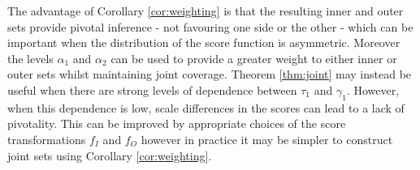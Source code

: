 \begin{remark}
	The advantage of Corollary \ref{cor:weighting} is that the resulting inner and outer sets provide pivotal inference - not favouring one side or the other - which can be important when the distribution of the score function is asymmetric. Moreover the levels $\alpha_1$ and $\alpha_2$ can be used to provide a greater weight to either inner or outer sets whilst maintaining joint coverage. Theorem \ref{thm:joint} may instead be useful when there are strong levels of dependence between $\tau_1$ and $\gamma_1$. However, when this dependence is low, scale differences in the scores can lead to a lack of pivotality. This can be improved by appropriate choices of the score transformations $f_I$ and $f_O$ however in practice it may be simpler to construct joint sets using Corollary \ref{cor:weighting}. 
\end{remark}

